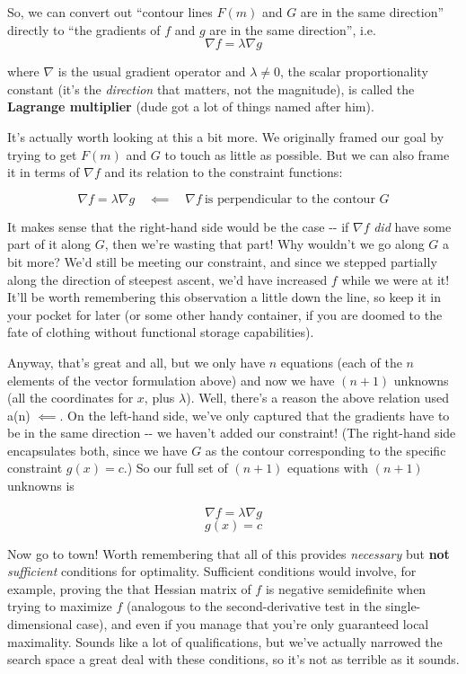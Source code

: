 \documentclass[letterpaper,12pt]{report}
\begin{document}
So, we can convert out ``contour lines \(F(m)\) and \(G\) are in the same
direction'' directly to ``the gradients of \(f\) and \(g\) are in the same
direction'', i.e. \[\nabla f = \lambda \nabla g \]

where \(\nabla\) is the usual gradient operator and \(\lambda \neq 0\),
the scalar proportionality constant (it's the \emph{direction} that
matters, not the magnitude), is called the \textbf{Lagrange multiplier}
(dude got a lot of things named after him).

It's actually worth looking at this a bit more. We originally framed our
goal by trying to get \(F(m)\) and \(G\) to touch as little as possible.
But we can also frame it in terms of \(\nabla f\) and its relation to
the constraint functions:

\[\nabla f = \lambda \nabla g \quad \impliedby \quad \nabla f \ \text{is perpendicular to the contour } G \]

It makes sense that the right-hand side would be the case -\/- if
\(\nabla f\) \emph{did} have some part of it along \(G\), then we're
wasting that part! Why wouldn't we go along \(G\) a bit more? We'd still
be meeting our constraint, and since we stepped partially along the
direction of steepest ascent, we'd have increased \(f\) while we were at
it! It'll be worth remembering this observation a little down the line,
so keep it in your pocket for later (or some other handy container, if
you are doomed to the fate of clothing without functional storage
capabilities).

Anyway, that's great and all, but we only have \(n\) equations (each of
the \(n\) elements of the vector formulation above) and now we have
\((n+1)\) unknowns (all the coordinates for \(x\), plus \(\lambda\)).
Well, there's a reason the above relation used a(n) \(\impliedby\). On
the left-hand side, we've only captured that the gradients have to be in
the same direction -\/- we haven't added our constraint! (The right-hand
side encapsulates both, since we have \(G\) as the contour corresponding
to the specific constraint \(g(x) = c\).) So our full set of \((n+1)\)
equations with \((n+1)\) unknowns is

\[\nabla f = \lambda \nabla g \] \[g(x) = c\]

Now go to town! Worth remembering that all of this provides
\emph{necessary} but \textbf{not} \emph{sufficient} conditions for
optimality. Sufficient conditions would involve, for example, proving
the that Hessian matrix of \(f\) is negative semidefinite when trying to
maximize \(f\) (analogous to the second-derivative test in the
single-dimensional case), and even if you manage that you're only
guaranteed local maximality. Sounds like a lot of qualifications, but
we've actually narrowed the search space a great deal with these
conditions, so it's not as terrible as it sounds.
\end{document}
